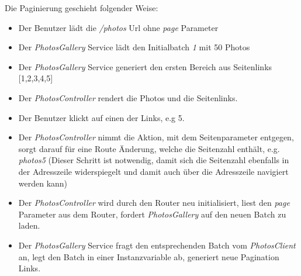Die Paginierung geschieht folgender Weise:

\begin{itemize}
  \item Der Benutzer lädt die \textit{/photos} Url ohne \textit{page} Parameter
  \item Der \textit{PhotosGallery} Service lädt den Initialbatch \textit{1} mit 50 Photos 
  \item Der \textit{PhotosGallery} Service generiert den ersten Bereich aus Seitenlinks [1,2,3,4,5]
  \item Der \textit{PhotosController} rendert die Photos und die Seitenlinks.
  \item Der Benutzer klickt auf einen der Links, e.g 5.
  \item Der \textit{PhotosController} nimmt die Aktion, mit dem Seitenparameter entgegen, sorgt darauf für eine Route Änderung, welche die Seitenzahl enthält, e.g. \textit{\/photos\/5}
  (Dieser Schritt ist notwendig, damit sich die Seitenzahl ebenfalls in der Adresszeile widerspiegelt und damit auch über die Adresszeile navigiert werden kann)
  \item Der \textit{PhotosController} wird durch den Router neu initialisiert, liest den \textit{page} Parameter aus dem Router, fordert \textit{PhotosGallery} auf den neuen Batch zu laden.
  \item Der \textit{PhotosGallery} Service fragt den entsprechenden Batch vom \textit{PhotosClient} an, legt den Batch in einer Instanzvariable ab, generiert neue Pagination Links.
\end{itemize}

